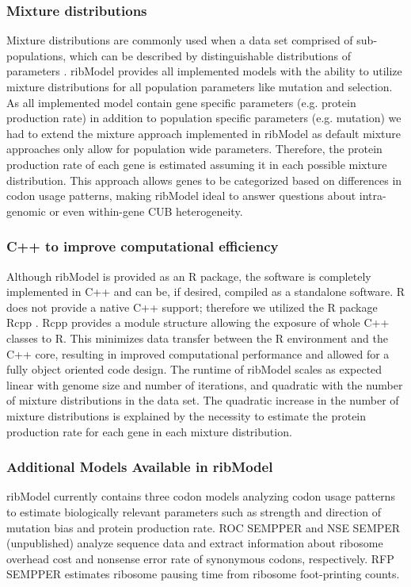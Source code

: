 \documentclass{bioinfo}
\newcommand{\package}{ribModel } %
\begin{document}
\subsubsection*{Mixture distributions}
Mixture distributions are commonly used when a data set comprised of sub-populations, which can be described by distinguishable distributions of parameters \citep{gelman2013}. \package provides all implemented models with the ability to utilize mixture distributions for all population parameters like mutation and selection. As all implemented model contain gene specific parameters (e.g. protein production rate) in addition to population specific parameters (e.g. mutation) we had to extend the mixture approach implemented in \package as default mixture approaches only allow for population wide parameters. Therefore, the protein production rate of each gene is estimated assuming it in each possible mixture distribution. This approach allows genes to be categorized based on differences in codon usage patterns, making \package ideal to answer questions about intra-genomic or even within-gene CUB heterogeneity. 

\subsubsection*{C++ to improve computational efficiency}
Although \package is provided as an R package, the software is completely implemented in C++ and can be, if desired, compiled as a standalone software.
R does not provide a native C++ support; therefore we utilized the R package Rcpp \citep{rcpp_package}. 
Rcpp provides a module structure allowing the exposure of whole C++ classes to R. 
This minimizes data transfer between the R environment and the C++ core, resulting in improved computational performance and allowed for a fully object oriented code design. 
The runtime of \package scales as expected linear with genome size and number of iterations, and quadratic with the number of mixture distributions in the data set. The quadratic increase in the number of mixture distributions is explained by the necessity to estimate the protein production rate for each gene in each mixture distribution.  

\subsubsection*{Additional Models Available in \package}
\package currently contains three codon models analyzing codon usage patterns to estimate biologically relevant parameters such as strength and direction of mutation bias and protein production rate. 
ROC SEMPPER \cite{gilchrist2015} and NSE SEMPER (unpublished) analyze sequence data and extract information about ribosome overhead cost and nonsense error rate of synonymous codons, respectively. 
RFP SEMPPER estimates ribosome pausing time from ribosome foot-printing counts.
\end{document}
